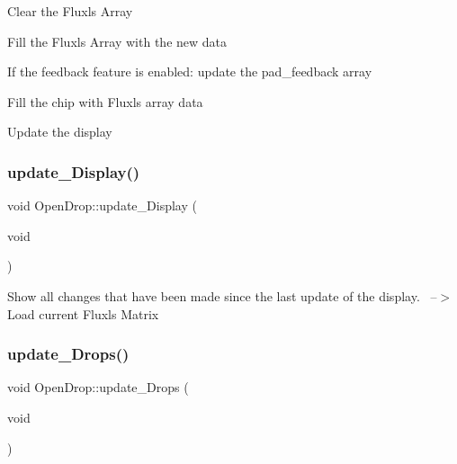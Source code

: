 \begin{DoxyEnumerate}
\item Clear the Fluxls Array~\newline

\item Fill the Fluxls Array with the new data~\newline

\item If the feedback feature is enabled\+: update the pad\+\_\+feedback array~\newline

\item Fill the chip with Fluxls array data~\newline

\item Update the display 
\end{DoxyEnumerate}\mbox{\label{class_open_drop_a95a40fe5db3d7187c2932e301f295d12}} 
\subsubsection{\texorpdfstring{update\+\_\+\+Display()}{update\_Display()}}
{\footnotesize\ttfamily void Open\+Drop\+::update\+\_\+\+Display (\begin{DoxyParamCaption}\item[{void}]{ }\end{DoxyParamCaption})}

Show all changes that have been made since the last update of the display.~\newline
--$>$ Load current Fluxls Matrix \mbox{\label{class_open_drop_ab92f14cd428512fc3572c9a08cb7952e}} 
\subsubsection{\texorpdfstring{update\+\_\+\+Drops()}{update\_Drops()}}
{\footnotesize\ttfamily void Open\+Drop\+::update\+\_\+\+Drops (\begin{DoxyParamCaption}\item[{void}]{ }\end{DoxyParamCaption})}

